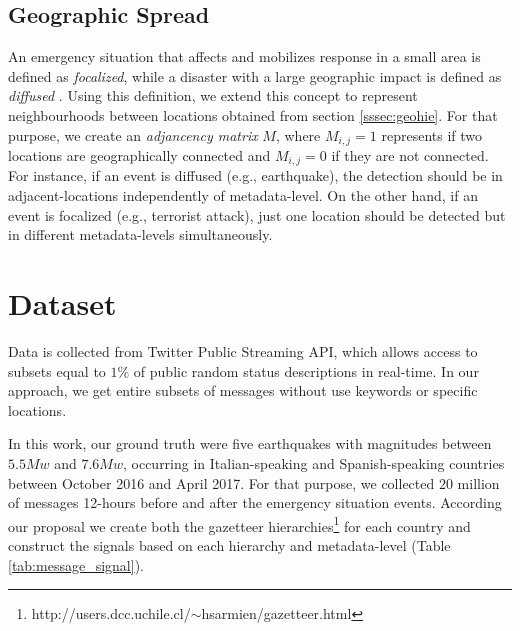 \documentclass{llncs}
\begin{document}
\subsection{Geographic Spread}\label{sssec:geospread}

An emergency situation that affects and mobilizes response in a small area is defined as \textit{focalized}, while a disaster with a large geographic impact is defined as \textit{diffused} \cite{olteanu2015expect}. Using this definition, we extend this concept to represent neighbourhoods between locations obtained from section \ref{sssec:geohie}. For that purpose, we create an \textit{adjancency matrix} $M$, where $M_{i,j} = 1$ represents if two locations are geographically connected and $M_{i,j} = 0$ if they are not connected. For instance, if an event is diffused (e.g., earthquake), the detection should be in adjacent-locations independently of metadata-level. On the other hand, if an event is focalized (e.g., terrorist attack), just one location should be detected but in different metadata-levels simultaneously.

\section{Dataset}

Data is collected from Twitter Public Streaming API, which allows access to subsets equal to $1\%$ of public random status descriptions in real-time. In our approach, we get entire subsets of messages without use keywords or specific locations.

In this work, our ground truth were five earthquakes with magnitudes between $5.5Mw$ and $7.6Mw$, occurring in Italian-speaking and Spanish-speaking countries between October 2016 and April 2017. For that purpose, we collected $20$ million of messages 12-hours before and after the emergency situation events. According our proposal we create both the gazetteer hierarchies\footnote{http://users.dcc.uchile.cl/$\sim$hsarmien/gazetteer.html} for each country and construct the signals based on each hierarchy and metadata-level (Table \ref{tab:message_signal}).  

\end{document}
